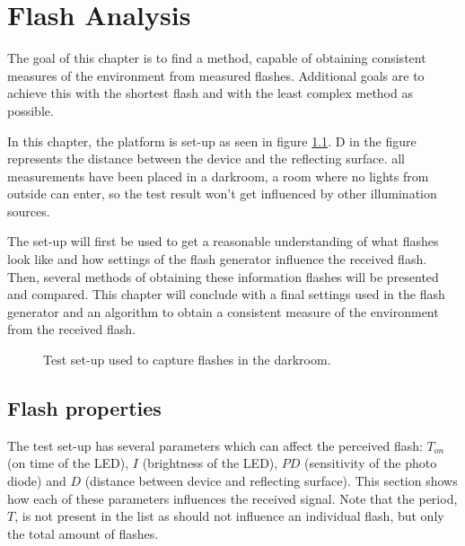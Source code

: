 \chapter{Flash Analysis}
\label{chp:Flash_Analysis}


The goal of this chapter is to find a method, capable of obtaining consistent measures of the environment from measured flashes. Additional goals are to achieve this with the shortest flash and with the least complex method as possible. 

In this chapter, the platform is set-up as seen in figure \ref{fig:Flashcapturing}. D in the figure represents the distance between the device and the reflecting surface. all measurements have been placed in a darkroom, a room where no lights from outside can enter, so the test result won't get influenced by other illumination sources.
 
The set-up will first be used to get a reasonable understanding of what flashes look like and how settings of the flash generator influence the received flash. Then, several methods of obtaining these information flashes will be presented and compared. This chapter will conclude with a final settings used in the flash generator and an algorithm to obtain a consistent measure of the environment from the received flash.
\begin{figure}
	\centering     %
	\label{fig:Flashcapturing}
	\caption{Test set-up used to capture flashes in the darkroom.}
\end{figure}

\section{Flash properties}
\label{sec:Flash_generator}
The test set-up has several parameters which can affect the perceived flash: $T_{on}$ (on time of the LED), $I$ (brightness of the LED), $PD$ (sensitivity of the photo diode) and $D$ (distance between device and reflecting surface). This section shows how each of these parameters influences the received signal. Note that the period, $T$, is not present in the list as should not influence an individual flash, but only the total amount of flashes.

